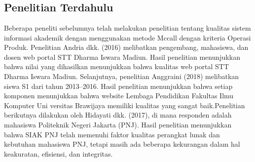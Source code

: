 %
%
%
%

\chapter{\babDua}

\section{Penelitian Terdahulu}
Beberapa peneliti sebelumnya telah melakukan penelitian tentang kualitas sistem informasi akademik dengan menggunakan metode Mccall dengan kriteria Operasi Produk. Penelitian Andria dkk. (2016) melibatkan pengembang, mahasiswa, dan dosen web portal STT Dharma Iswara Madiun. Hasil penelitian menunjukkan bahwa nilai yang dihasilkan menunjukkan bahwa kualitas web portal STT Dharma Iswara Madiun. Selanjutnya, penelitian Anggraini (2018) melibatkan siswa S1 dari tahun 2013–2016. Hasil penelitian menunjukkan bahwa setiap komponen menunjukkan bahwa website Lembaga Pendidikan Fakultas Ilmu Komputer Uni versitas Brawijaya memiliki kualitas yang sangat baik.Penelitian berikutnya dilakukan oleh Hidayati dkk. (2017), di mana responden adalah mahasiswa Politeknik Negeri Jakarta (PNJ). Hasil penelitian menunjukkan bahwa SIAK PNJ telah memenuhi faktor kualitas perangkat lunak dan kebutuhan mahasiswa PNJ, tetapi masih ada beberapa kekurangan dalam hal keakuratan, efisiensi, dan integritas. 


